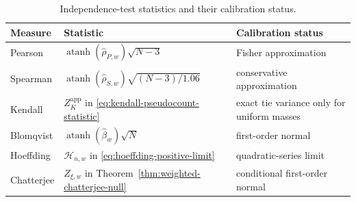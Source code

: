 \begin{table}[H]
  \centering
  \caption{Independence-test statistics and their calibration status.}
  \label{tab:independence-tests}
  \begin{tabular}{lll}
    \toprule
    Measure & Statistic & Calibration status \\
    \midrule
    Pearson
      & $\operatorname{atanh}(\widehat\rho_{P,w})\sqrt{N-3}$
      & Fisher approximation \\
    Spearman
      & $\operatorname{atanh}(\widehat\rho_{S,w})\sqrt{(N-3)/1.06}$
      & conservative approximation \\
    Kendall
      & $Z_K^{\mathrm{app}}$ in
        \eqref{eq:kendall-pseudocount-statistic}
      & exact tie variance only for uniform masses \\
    Blomqvist
      & $\operatorname{atanh}(\widehat\beta_w)\sqrt N$
      & first-order normal \\
    Hoeffding
      & $\mathcal H_{n,w}$ in \eqref{eq:hoeffding-positive-limit}
      & quadratic-series limit \\
    Chatterjee
      & $Z_{\xi,w}$ in Theorem~\ref{thm:weighted-chatterjee-null}
      & conditional first-order normal \\
    \bottomrule
  \end{tabular}
\end{table}
